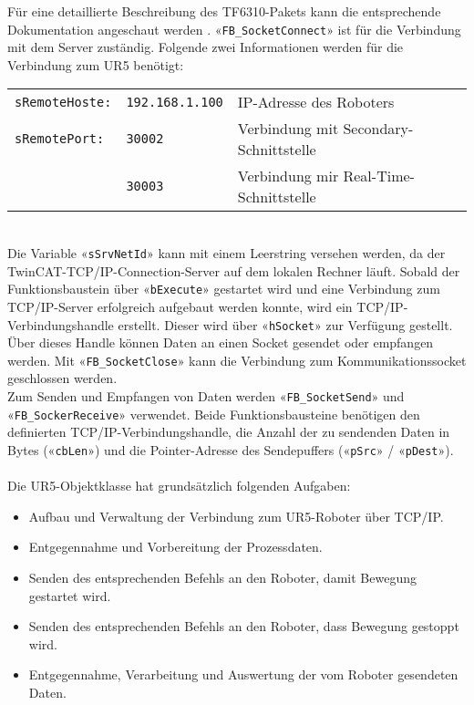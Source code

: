 		Für eine detaillierte Beschreibung des TF6310-Pakets kann die entsprechende Dokumentation angeschaut werden \cite{TF6310}. 
		«\verb|FB_SocketConnect|» ist für die Verbindung mit dem Server zuständig. Folgende zwei Informationen werden für die Verbindung zum UR5 benötigt: 
		
		\begin{tabularx}{\textwidth}{@{}>{}p{10em} @{}>{}p{8em} X@{}}
			\verb|sRemoteHoste:| 	& \verb|192.168.1.100|	& IP-Adresse des Roboters 
			\\
			\verb|sRemotePort:| 	& \verb|30002| 			& Verbindung mit Secondary-Schnittstelle
			\\
									& \verb|30003|			& Verbindung mir Real-Time-Schnittstelle
			\\
		\end{tabularx}
		\vspace{3mm}
		\\
		Die Variable «\verb|sSrvNetId|» kann mit einem Leerstring versehen werden, da der TwinCAT-TCP/IP-Connection-Server auf dem lokalen Rechner läuft. Sobald der Funktionsbaustein über «\verb|bExecute|» gestartet wird und eine Verbindung zum TCP/IP-Server erfolgreich aufgebaut werden konnte, wird ein TCP/IP-Verbindungshandle erstellt. Dieser wird über «\verb|hSocket|» zur Verfügung gestellt. Über dieses Handle können Daten an einen Socket gesendet oder empfangen werden. Mit «\verb|FB_SocketClose|» kann die Verbindung zum Kommunikationssocket geschlossen werden.
		\\
		Zum Senden und Empfangen von Daten werden «\verb|FB_SocketSend|» und «\verb|FB_SockerReceive|» verwendet. Beide Funktionsbausteine benötigen den definierten TCP/IP-Verbindungshandle, die Anzahl der zu sendenden Daten in Bytes («\verb|cbLen|») und die Pointer-Adresse des Sendepuffers («\verb|pSrc|» / «\verb|pDest|»). 
		\\
		\\
		Die UR5-Objektklasse hat grundsätzlich folgenden Aufgaben: 
		\begin{itemize}
			\item Aufbau und Verwaltung der Verbindung zum UR5-Roboter über TCP/IP.
			\item Entgegennahme und Vorbereitung der Prozessdaten.
			\item Senden des entsprechenden Befehls an den Roboter, damit Bewegung gestartet wird.
			\item Senden des entsprechenden Befehls an den Roboter, dass Bewegung gestoppt wird.
			\item Entgegennahme, Verarbeitung und Auswertung der vom Roboter gesendeten Daten.
		\end{itemize}
		
